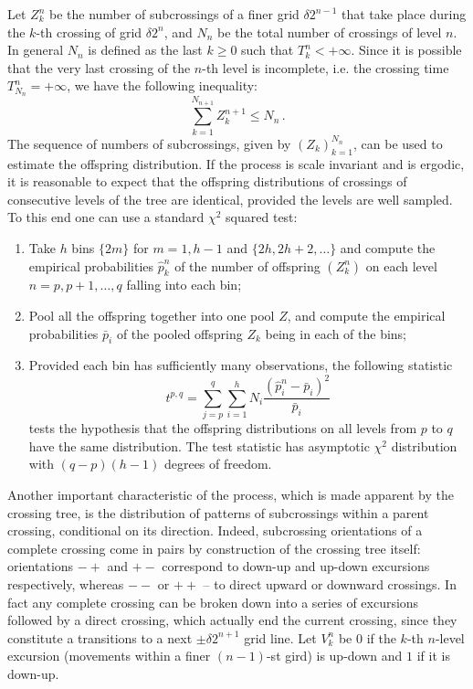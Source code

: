 Let $Z_k^n$ be the number of subcrossings of a finer grid $\delta 2^{n-1}$ that take
place during the $k$-th crossing of grid $\delta 2^n$, and $N_n$ be the total number
of crossings of level $n$. In general $N_n$ is defined as the last $k\geq0$ such that
$T_k^n < +\infty$. Since it is possible that the very last crossing of the $n$-th
level is incomplete, i.e. the crossing time $T_{N_n}^n = +\infty$, we have the following
inequality:
\[ \sum_{k=1}^{N_{n+1}} Z_k^{n+1} \leq N_n \,.\]
The sequence of numbers of subcrossings, given by $(Z_k)_{k=1}^{N_n}$, can be used to
estimate the offspring distribution. If the process is scale invariant and is ergodic,
it is reasonable to expect that the offspring distributions of crossings of consecutive
levels of the tree are identical, provided the levels are well sampled. To this end one
can use a standard $\chi^2$ squared test: \begin{enumerate}
    \item Take $h$ bins $\{2m\}$ for $m = 1,h-1$ and $\{2h, 2h+2,\ldots\}$ and compute
    the empirical probabilities $\hat{p}_k^n$ of the number of offspring $(Z_k^n)$ on
    each level $n=p, p+1, \ldots, q$ falling into each bin;
    \item Pool all the offspring together into one pool $Z$, and compute the empirical
    probabilities $\bar{p}_i$ of the pooled offspring $Z_k$ being in each of the bins;
    \item Provided each bin has sufficiently many observations, the following statistic
    \[ t^{p,q} = \sum_{j=p}^q \sum_{i=1}^h N_i \frac{(\hat{p}_i^n-\bar{p}_i)^2}{\bar{p}_i} \]
    tests the hypothesis that the offspring distributions on all levels from $p$ to $q$
    have the same distribution. The test statistic has asymptotic $\chi^2$ distribution
    with $(q-p)(h-1)$ degrees of freedom.
\end{enumerate}

Another important characteristic of the process, which is made apparent by the crossing
tree, is the distribution of patterns of subcrossings within a parent crossing, conditional
on its direction. Indeed, subcrossing orientations of a complete crossing come in
pairs by construction of the crossing tree itself: orientations $-+$ and $+-$ correspond
to down-up and up-down excursions respectively, whereas $--$ or $++$ -- to direct
upward or downward crossings. In fact any complete crossing can be broken down
into a series of excursions followed by a direct crossing, which actually end the
current crossing, since they constitute a transitions to a next $\pm\delta 2^{n+1}$
grid line. Let $V_k^n$ be $0$ if the $k$-th $n$-level excursion (movements within a finer
$(n-1)$-st gird) is up-down and $1$ if it is down-up.

